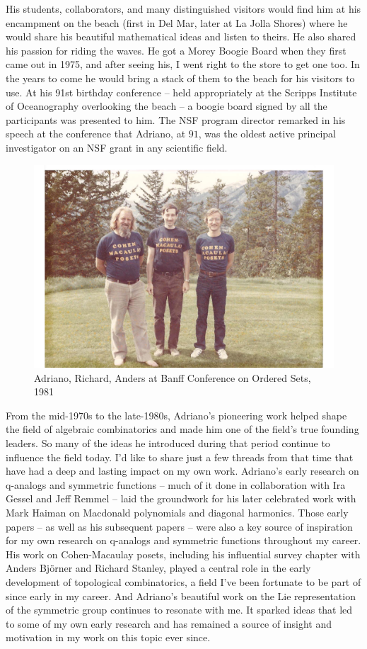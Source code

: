 \documentclass{notices}
\begin{document}
His students, collaborators, and many distinguished visitors would find him at his  encampment on the beach (first in Del Mar, later at La Jolla Shores) where he would share his beautiful mathematical ideas and listen to theirs. He also shared his passion for riding the waves.    He got a Morey Boogie Board when they first came out in 1975, and after seeing his, I went right to the store to get one too. In the years to come he would bring a stack of them to the beach for his visitors to use.  At his 91st birthday conference -- held appropriately at the Scripps Institute of Oceanography overlooking the beach -- a boogie board signed by all the participants was presented to him.  The NSF program director remarked in his speech at the conference that  Adriano, at $91$, was the oldest active principal investigator on an NSF grant in any scientific field. 

\begin{figure}
    \centering
    \includegraphics[width=0.95\linewidth]{Michelle_Wachs/cmposets.pdf} 
  {\footnotesize Adriano, Richard, Anders at Banff Conference on Ordered Sets, 1981}
    \end{figure}
From the mid-1970s to the late-1980s, Adriano's pioneering work helped shape the field of algebraic combinatorics and made him  one of the field's true founding leaders. So many of the ideas he introduced during that  period continue to influence the field today. I’d like to share just a few threads from that time that have had a deep and lasting impact on my own work.
 Adriano’s early research on 
q-analogs and symmetric functions -- much of it done in collaboration with Ira Gessel and Jeff Remmel -- laid the groundwork for his later celebrated work with Mark Haiman on Macdonald polynomials and diagonal harmonics. Those early papers -- as well as his subsequent papers --  were also a key source of inspiration for my own research on 
q-analogs and symmetric functions throughout my career. His work on Cohen-Macaulay posets, including his influential survey chapter  with Anders Bj\"orner and Richard Stanley, played a central role in the early development of topological combinatorics,  a field I’ve been fortunate to be part of since  early in my career. And Adriano’s beautiful work on the Lie representation of the symmetric group continues to resonate with me. It sparked ideas that led to some of my own early research and has remained a source of insight and motivation in my work on this topic ever since.
\end{document}
